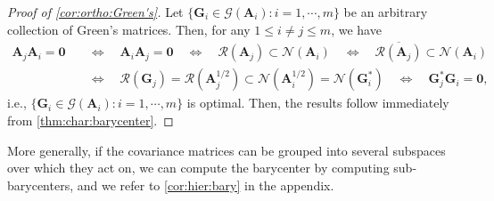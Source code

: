 \documentclass[noinfoline]{imsart}\setcounter{tocdepth}{2}
\newcommand{\m}[1]{\mathbf{#1}} %
\renewcommand{\c}[1]{\mathcal{#1}} %
\theoremstyle{plain}
\begin{document}
\begin{proof}[Proof of \cref{cor:ortho:Green's}]
Let $\{\m{G}_{i} \in \c{G}(\m{A}_{i}): i = 1, \cdots, m\}$ be an arbitrary collection of Green's matrices. Then, for any $1 \le i \neq j \le m$, we have
\begin{align*}
    \m{A}_{j} \m{A}_{i} = \m{0}
    \quad &\Leftrightarrow \quad \m{A}_{i} \m{A}_{j} = \m{0} \quad \Leftrightarrow \quad \c{R}(\m{A}_{j})\subset \c{N}(\m{A}_{i}) \quad \Leftrightarrow \quad \overline{\c{R}(\m{A}_{j})} \subset \c{N}(\m{A}_{i}) \\
    &\Leftrightarrow \quad \c{R}(\m{G}_{j}) = \c{R}(\m{A}_{j}^{1/2}) \subset \c{N}(\m{A}_{i}^{1/2}) = \c{N}(\m{G}_{i}^{*}) \quad \Leftrightarrow \quad \m{G}_{j}^{*} \m{G}_{i} = \m{0},
\end{align*}
i.e., $\{\m{G}_{i} \in \c{G}(\m{A}_{i}): i = 1, \cdots, m\}$ is optimal. Then, the results follow immediately from \cref{thm:char:barycenter}.
\end{proof}

More generally, if the covariance matrices can be grouped into several subspaces over which they act on, we can compute the barycenter by computing sub-barycenters, and we refer to \cref{cor:hier:bary} in the appendix.
\end{document}
